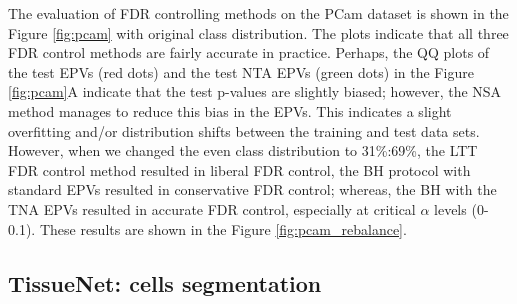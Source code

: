 \documentclass{article}
\begin{document}
The evaluation of FDR controlling methods on the PCam dataset is shown in the Figure \ref{fig:pcam} with original class distribution. The plots indicate that all three FDR control methods are fairly accurate in practice. Perhaps, the QQ plots of the test EPVs (red dots) and the test NTA EPVs (green dots) in the Figure \ref{fig:pcam}A indicate that the test p-values are slightly biased; however, the NSA method manages to reduce this bias in the EPVs. This indicates a slight overfitting and/or distribution shifts between the training and test data sets. However, when we changed the even class distribution to 31\%:69\%, the LTT FDR control method resulted in liberal FDR control, the BH protocol with standard EPVs resulted in conservative FDR control; whereas, the BH with the TNA EPVs resulted in accurate FDR control,  especially at critical $\alpha$ levels (0-0.1). These results are shown in the Figure \ref{fig:pcam_rebalance}.


%
%
%

\subsection{TissueNet: cells segmentation}
\end{document}
